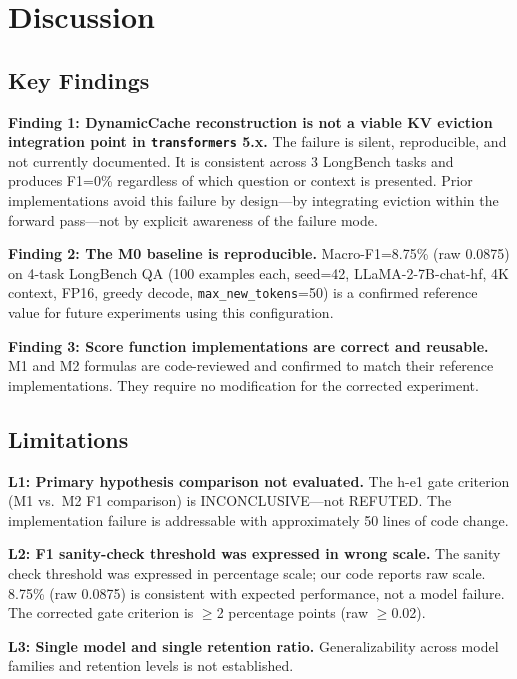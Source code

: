 \section{Discussion}
\label{sec:discussion}

\subsection{Key Findings}

\textbf{Finding 1: DynamicCache reconstruction is not a viable KV eviction integration point in \texttt{transformers} 5.x.} The failure is silent, reproducible, and not currently documented. It is consistent across 3 LongBench tasks and produces F1=0\% regardless of which question or context is presented. Prior implementations avoid this failure by design---by integrating eviction within the forward pass---not by explicit awareness of the failure mode.

\textbf{Finding 2: The M0 baseline is reproducible.} Macro-F1=8.75\% (raw 0.0875) on 4-task LongBench QA (100 examples each, seed=42, LLaMA-2-7B-chat-hf, 4K context, FP16, greedy decode, \texttt{max\_new\_tokens}=50) is a confirmed reference value for future experiments using this configuration.

\textbf{Finding 3: Score function implementations are correct and reusable.} M1 and M2 formulas are code-reviewed and confirmed to match their reference implementations. They require no modification for the corrected experiment.

\subsection{Limitations}

\textbf{L1: Primary hypothesis comparison not evaluated.} The h-e1 gate criterion (M1 vs.\ M2 F1 comparison) is INCONCLUSIVE---not REFUTED. The implementation failure is addressable with approximately 50 lines of code change.

\textbf{L2: F1 sanity-check threshold was expressed in wrong scale.} The sanity check threshold was expressed in percentage scale; our code reports raw scale. 8.75\% (raw 0.0875) is consistent with expected performance, not a model failure. The corrected gate criterion is $\geq$2 percentage points (raw $\geq$0.02).

\textbf{L3: Single model and single retention ratio.} Generalizability across model families and retention levels is not established.


